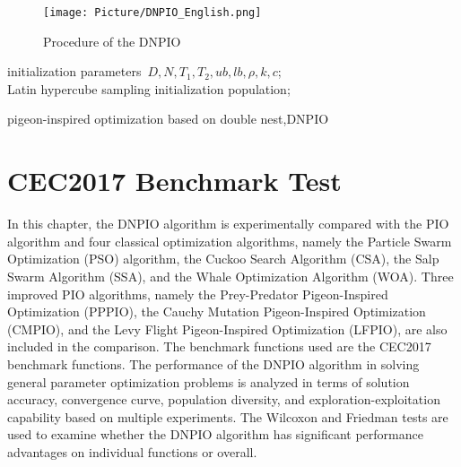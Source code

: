 \documentclass[preprint,review,compress,12pt]{elsarticle}
\begin{document}
\begin{figure}[H]
\centering
\texttt{[image: Picture/DNPIO\_English.png]}
\caption{Procedure of the DNPIO}
\label{fig1}
\end{figure}

\begin{algorithm}[H]
  initialization parameters\ $D,N,T_1,T_2,ub,lb,\rho ,k,c$;\\
  Latin hypercube sampling initialization population;\\ 
  \caption{pigeon-inspired optimization based on double nest,DNPIO}
\end{algorithm}


\section{CEC2017 Benchmark Test}
In this chapter, the DNPIO algorithm is experimentally compared with the PIO algorithm and four classical optimization algorithms, namely the Particle Swarm Optimization (PSO) algorithm\cite{488968}, the Cuckoo Search Algorithm (CSA)\cite{yang2009cuckoo}, the Salp Swarm Algorithm (SSA)\cite{mirjalili2017salp}, and the Whale Optimization Algorithm (WOA)\cite{mirjalili2016whale}. Three improved PIO algorithms, namely the Prey-Predator Pigeon-Inspired Optimization (PPPIO)\cite{sun2014pid}, the Cauchy Mutation Pigeon-Inspired Optimization (CMPIO)\cite{yang2018automatic}, and the Levy Flight Pigeon-Inspired Optimization (LFPIO)\cite{liu2016pendulum}, are also included in the comparison. The benchmark functions used are the CEC2017 benchmark functions. The performance of the DNPIO algorithm in solving general parameter optimization problems is analyzed in terms of solution accuracy, convergence curve, population diversity, and exploration-exploitation capability based on multiple experiments. The Wilcoxon and Friedman tests are used to examine whether the DNPIO algorithm has significant performance advantages on individual functions or overall.
\end{document}
